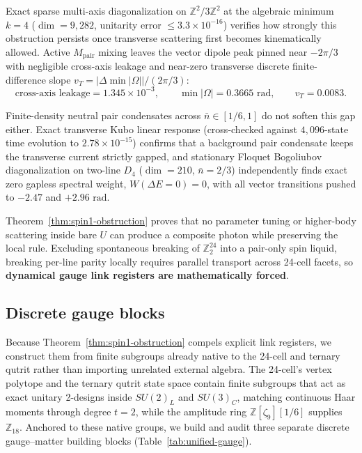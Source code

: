 Exact sparse multi-axis diagonalization on $\mathbb{Z}^2 / 3\mathbb{Z}^2$ at the algebraic minimum $k = 4$
($\dim = 9{,}282$, unitarity error $\le 3.3 \times 10^{-16}$) verifies how strongly this obstruction persists once
transverse scattering first becomes kinematically allowed. Active $M_{\mathrm{pair}}$ mixing leaves the vector dipole
peak pinned near $-2\pi/3$ with negligible cross-axis leakage and near-zero transverse discrete finite-difference slope
$v_T = |\Delta \min|\Omega|| / (2\pi/3)$:
\begin{equation}
\text{cross-axis leakage} = 1.345 \times 10^{-3},
\qquad
\min|\Omega| = 0.3665\text{ rad},
\qquad
v_T = 0.0083.
\label{eq:k4-dipole-gap}
\end{equation}

Finite-density neutral pair condensates across $\bar{n} \in [1/6, 1]$ do not soften this gap either. Exact transverse
Kubo linear response (cross-checked against $4{,}096$-state time evolution to $2.78 \times 10^{-15}$) confirms that a
background pair condensate keeps the transverse current strictly gapped, and stationary Floquet Bogoliubov
diagonalization on two-line $D_4$ ($\dim = 210$, $\bar{n} = 2/3$) independently finds exact zero gapless spectral
weight, $W(\Delta E = 0) = 0$, with all vector transitions pushed to $-2.47$ and $+2.96\text{ rad}$.

Theorem~\ref{thm:spin1-obstruction} proves that no parameter tuning or higher-body scattering inside bare $U$ can
produce a composite photon while preserving the local rule. Excluding spontaneous breaking of $\mathbb{Z}_2^{24}$ into
a pair-only spin liquid, breaking per-line parity locally requires parallel transport across 24-cell facets, so
\textbf{dynamical gauge link registers are mathematically forced}.

\subsection{Discrete gauge blocks}

Because Theorem~\ref{thm:spin1-obstruction} compels explicit link registers, we construct them from finite subgroups
already native to the 24-cell and ternary qutrit rather than importing unrelated external algebra. The 24-cell's vertex
polytope and the ternary qutrit state space contain finite subgroups that act as exact unitary 2-designs inside
$SU(2)_L$ and $SU(3)_C$, matching continuous Haar moments through degree $t = 2$, while the amplitude ring
$\mathbb{Z}[\zeta_9][1/6]$ supplies $\mathbb{Z}_{18}$. Anchored to these native groups, we build and audit three
separate discrete gauge--matter building blocks (Table~\ref{tab:unified-gauge}).

